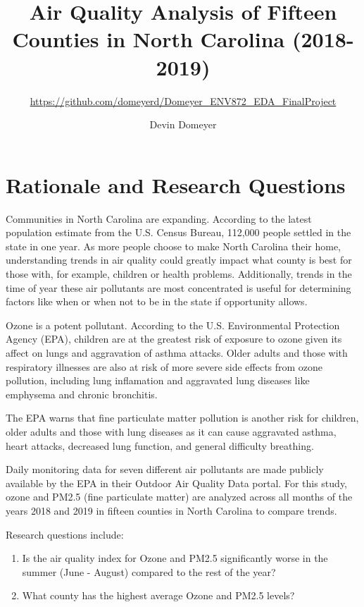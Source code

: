 \documentclass[
  12pt,
]{article}
\title{Air Quality Analysis of Fifteen Counties in North Carolina
(2018-2019)}
\subtitle{\url{https://github.com/domeyerd/Domeyer_ENV872_EDA_FinalProject}}
\author{Devin Domeyer}
\date{}
\begin{document}
\maketitle

\newpage
\tableofcontents 
\newpage
\listoftables 
\newpage
\listoffigures 
\newpage

\hypertarget{rationale-and-research-questions}{%
\section{Rationale and Research
Questions}\label{rationale-and-research-questions}}

Communities in North Carolina are expanding. According to the latest
population estimate from the U.S. Census Bureau, 112,000 people settled
in the state in one year. As more people choose to make North Carolina
their home, understanding trends in air quality could greatly impact
what county is best for those with, for example, children or health
problems. Additionally, trends in the time of year these air pollutants
are most concentrated is useful for determining factors like when or
when not to be in the state if opportunity allows.

Ozone is a potent pollutant. According to the U.S. Environmental
Protection Agency (EPA), children are at the greatest risk of exposure
to ozone given its affect on lungs and aggravation of asthma attacks.
Older adults and those with respiratory illnesses are also at risk of
more severe side effects from ozone pollution, including lung
inflamation and aggravated lung diseases like emphysema and chronic
bronchitis.

The EPA warns that fine particulate matter pollution is another risk for
children, older adults and those with lung diseases as it can cause
aggravated asthma, heart attacks, decreased lung function, and general
difficulty breathing.

Daily monitoring data for seven different air pollutants are made
publicly available by the EPA in their Outdoor Air Quality Data portal.
For this study, ozone and PM2.5 (fine particulate matter) are analyzed
across all months of the years 2018 and 2019 in fifteen counties in
North Carolina to compare trends.

Research questions include:

\begin{enumerate}
\def\labelenumi{\arabic{enumi}.}
\item
  Is the air quality index for Ozone and PM2.5 significantly worse in
  the summer (June - August) compared to the rest of the year?
\item
  What county has the highest average Ozone and PM2.5 levels?
\end{enumerate}
\end{document}
